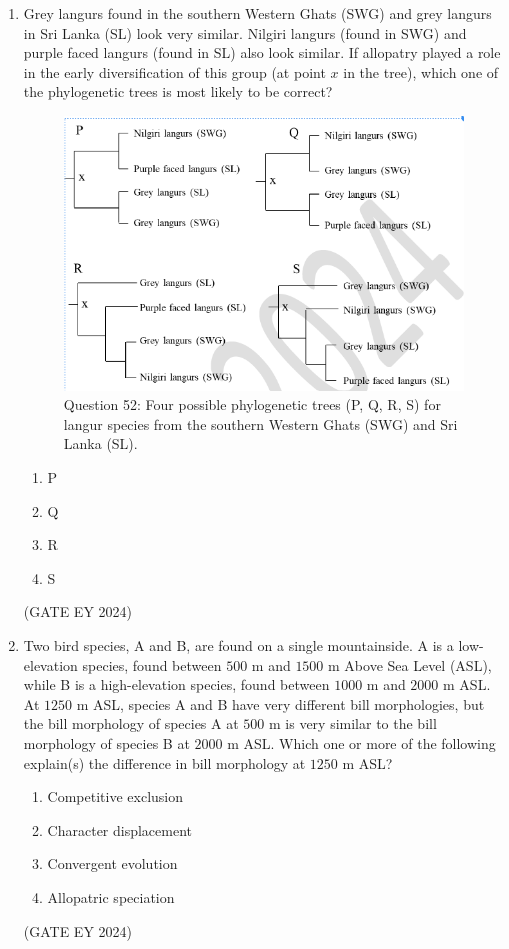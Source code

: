 \documentclass[journal]{IEEEtran}
\begin{document}
\begin{enumerate}
\item Grey langurs found in the southern Western Ghats (SWG) and grey langurs in Sri Lanka (SL) look very similar. Nilgiri langurs (found in SWG) and purple faced langurs (found in SL) also look similar. If allopatry played a role in the early diversification of this group (at point $x$ in the tree), which one of the phylogenetic trees is most likely to be correct?
\begin{figure}[!ht]
    \centering
    \includegraphics[width=0.8\columnwidth]{figs/Q-52.png}
    \caption{Question 52: Four possible phylogenetic trees (P, Q, R, S) for langur species from the southern Western Ghats (SWG) and Sri Lanka (SL).}
    \label{Q.52}
\end{figure}
    \begin{multicols}{2}
    \begin{enumerate}
        \item P
        \item Q
        \item R
        \item S
    \end{enumerate}
    \end{multicols}
\hfill{(GATE EY 2024)}

\item Two bird species, A and B, are found on a single mountainside. A is a low-elevation species, found between $500$ m and $1500$ m Above Sea Level (ASL), while B is a high-elevation species, found between $1000$ m and $2000$ m ASL. At $1250$ m ASL, species A and B have very different bill morphologies, but the bill morphology of species A at $500$ m is very similar to the bill morphology of species B at $2000$ m ASL. Which one or more of the following explain(s) the difference in bill morphology at $1250$ m ASL?
    \begin{multicols}{2}
    \begin{enumerate}
        \item Competitive exclusion
        \item Character displacement
        \item Convergent evolution
        \item Allopatric speciation
    \end{enumerate}
    \end{multicols}
\hfill{(GATE EY 2024)}


\end{enumerate}
\end{document}
